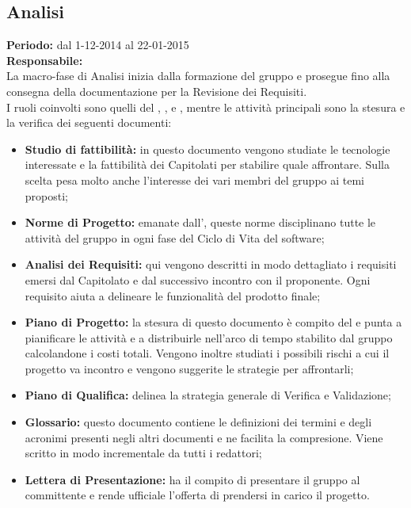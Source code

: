 \newpage
\subsection{Analisi}
\textbf{Periodo:} dal 1-12-2014 al 22-01-2015 \\
\textbf{Responsabile:} \VeFe \\
La macro-fase di Analisi inizia dalla formazione del gruppo e prosegue fino alla consegna della documentazione per la Revisione dei Requisiti. \\
I ruoli coinvolti sono quelli del \ruoloResponsabile{}, \ruoloAmministratore{}, \ruoloVerificatore{} e \ruoloAnalista{}, mentre le attività principali sono la stesura e la verifica dei seguenti documenti:

\begin{itemize}
\item \textbf{Studio di fattibilità:} in questo documento vengono studiate le tecnologie interessate e la fattibilità dei Capitolati per stabilire quale affrontare. Sulla scelta pesa molto anche l'interesse dei vari membri del gruppo ai temi proposti;
\item \textbf{Norme di Progetto:} emanate dall'\ruoloAmministratore{}, queste norme disciplinano tutte le attività del gruppo in ogni fase del Ciclo di Vita del software;
\item \textbf{Analisi dei Requisiti:} qui vengono descritti in modo dettagliato i requisiti emersi dal Capitolato e dal successivo incontro con il proponente. Ogni requisito aiuta a delineare le funzionalità del prodotto finale;
\item \textbf{Piano di Progetto:} la stesura di questo documento è compito del \ruoloResponsabile{} e punta a pianificare le attività e a distribuirle nell'arco di tempo stabilito dal gruppo calcolandone i costi totali. Vengono inoltre studiati i possibili rischi a cui il progetto va incontro e vengono suggerite le strategie per affrontarli;
\item \textbf{Piano di Qualifica:} delinea la strategia generale di Verifica e Validazione;
\item \textbf{Glossario:} questo documento contiene le definizioni dei termini e degli acronimi presenti negli altri documenti e ne facilita la compresione. Viene scritto in modo incrementale da tutti i redattori;
\item \textbf{Lettera di Presentazione:} ha il compito di presentare il gruppo al committente e rende ufficiale l'offerta di prendersi in carico il progetto.
\end{itemize}

